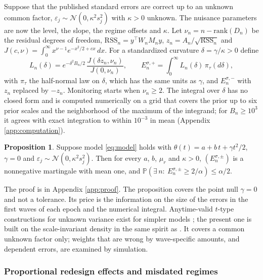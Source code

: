 \documentclass[Afour,sageh,times]{sagej}
\theoremstyle{definition}
\newtheorem{proposition}{Proposition}
\newcommand{\Prob}{\mathbb{P}}
\begin{document}
Suppose that the published standard errors are correct up to an unknown common factor, $\varepsilon_j \sim \mathcal{N}(0, \kappa^2 s_j^2)$ with $\kappa > 0$ unknown. The nuisance parameters are now the level, the slope, the regime offsets and $\kappa$. Let $\nu_n = n - \mathrm{rank}(D_n)$ be the residual degrees of freedom, $\mathrm{RSS}_n = y^\top W_n M_n y$, $z_n = A_n/\sqrt{\mathrm{RSS}_n}$ and $J(c,\nu) = \int_0^\infty x^{\nu-1} e^{-x^2/2 + c x}\, dx$. For a standardized curvature $\delta = \gamma/\kappa > 0$ define
\begin{equation}
L_n(\delta) = e^{-\delta^2 B_n/2}\, \frac{J(\delta z_n, \nu_n)}{J(0, \nu_n)}, \qquad E_n^{\sigma,+} = \int_0^\infty L_n(\delta)\, \pi_\tau(d\delta),
\label{eq:unknown}
\end{equation}
with $\pi_\tau$ the half-normal law on $\delta$, which has the same units as $\gamma$, and $E_n^{\sigma,-}$ with $z_n$ replaced by $-z_n$. Monitoring starts when $\nu_n \ge 2$. The integral over $\delta$ has no closed form and is computed numerically on a grid that covers the prior up to six prior scales and the neighborhood of the maximum of the integrand; for $B_n \ge 10^3$ it agrees with exact integration to within $10^{-3}$ in mean (Appendix \ref{app:computation}).

\begin{proposition}
\label{prop:scale}
Suppose model \eqref{eq:model} holds with $\theta(t) = a + b\,t + \gamma t^2/2$, $\gamma = 0$ and $\varepsilon_j \sim \mathcal{N}(0, \kappa^2 s_j^2)$. Then for every $a$, $b$, $\mu_r$ and $\kappa > 0$, $(E_n^{\sigma,\pm})$ is a nonnegative martingale with mean one, and $\Prob(\exists\, n:\ E_n^{\sigma,\pm} \ge 2/\alpha) \le \alpha/2$.
\end{proposition}

The proof is in Appendix \ref{app:proof}. The proposition covers the point null $\gamma = 0$ and not a tolerance. Its price is the information on the size of the errors in the first waves of each epoch and the numerical integral. Anytime-valid $t$-type constructions for unknown variance exist for simpler models \citep{wang2025}; the present one is built on the scale-invariant density in the same spirit as \citet{perezortiz2024}. It covers a common unknown factor only; weights that are wrong by wave-specific amounts, and dependent errors, are examined by simulation.

\subsubsection{Proportional redesign effects and misdated regimes}
\end{document}
